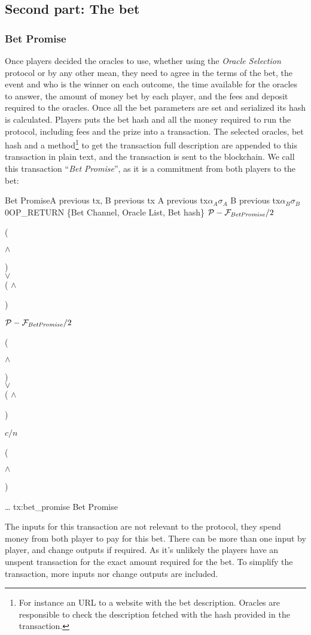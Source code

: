 \subsection{Second part: The bet}

\subsubsection{Bet Promise}
Once players decided the oracles to use, whether using the \textit{Oracle
  Selection} protocol or by any other mean, they need to agree in the terms of
  the bet, the event and who is the winner on each outcome, the time available
  for the oracles to answer, the amount of money bet by each player, and the
  fees and deposit required to the oracles.
Once all the bet parameters are set and serialized its hash is calculated.
Players puts the bet hash and all the money required to run the protocol,
  including fees and the prize into a transaction.
The selected oracles, bet hash and a method\footnote{For instance an URL to a
  website with the bet description. Oracles are responsible to check the
  description fetched with the hash provided in the transaction.} to get the
  transaction full description are appended to this transaction in plain text,
  and the transaction is sent to the blockchain.
We call this transaction ``\textit{Bet Promise}'', as it is a commitment from both
  players to the bet:

\transaction
    {Bet Promise}{A previous tx, B previous tx}
    {A previous tx}{$\alpha_A$}{$\sigma_A$}
    {B previous tx}{$\alpha_B$}{$\sigma_B$}
    \stopinputs
    {0}{\footnotesize{OP\_RETURN \{Bet Channel, Oracle List, Bet hash\}}}
    {$\mathcal{P} - \mathcal{F}_{\mathit{Bet Promise}} / 2$}{(\signature{A} $\wedge$ \signature{B}) \\
                                                   $\vee$ \\
                                            ( $\wedge$ \signature{A}) }
    {$\mathcal{P} - \mathcal{F}_{\mathit{Bet Promise}} / 2$}{(\signature{A} $\wedge$ \signature{B}) \\
                                                   $\vee$ \\
                                            ( $\wedge$ \signature{B}) }
    {$c/n$}{(\signature{A} $\wedge$ \signature{B})}
    {\ldots }{}
    \stopoutputs
    {tx:bet_promise}
    {Bet Promise}

The inputs for this transaction are not relevant to the protocol, they spend
  money from both player to pay for this bet.
There can be more than one input by player, and change outputs if required.
As it's unlikely the players have an unspent transaction for the exact amount
  required for the bet.
To simplify the transaction, more inputs nor change outputs are included.

